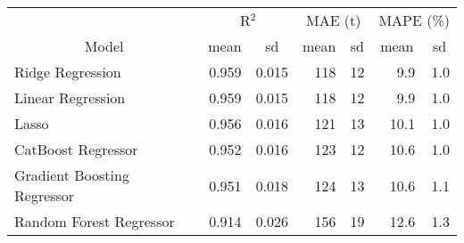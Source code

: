 
\begin{tabular}[t]{lrrrrrr}
\toprule
\multicolumn{1}{c}{ } & \multicolumn{2}{c}{R$^2$} & \multicolumn{2}{c}{MAE (t)} & \multicolumn{2}{c}{MAPE (\%)} \\
\cmidrule(l{3pt}r{3pt}){2-3} \cmidrule(l{3pt}r{3pt}){4-5} \cmidrule(l{3pt}r{3pt}){6-7}
\multicolumn{1}{c}{Model} & \multicolumn{1}{c}{mean} & \multicolumn{1}{c}{sd} & \multicolumn{1}{c}{mean} & \multicolumn{1}{c}{sd} & \multicolumn{1}{c}{mean} & \multicolumn{1}{c}{sd}\\
\midrule
Ridge Regression & 0.959 & 0.015 & 118 & 12 & 9.9 & 1.0\\
Linear Regression & 0.959 & 0.015 & 118 & 12 & 9.9 & 1.0\\
Lasso & 0.956 & 0.016 & 121 & 13 & 10.1 & 1.0\\
CatBoost Regressor & 0.952 & 0.016 & 123 & 12 & 10.6 & 1.0\\
Gradient Boosting Regressor & 0.951 & 0.018 & 124 & 13 & 10.6 & 1.1\\
Random Forest Regressor & 0.914 & 0.026 & 156 & 19 & 12.6 & 1.3\\
\bottomrule
\end{tabular}
